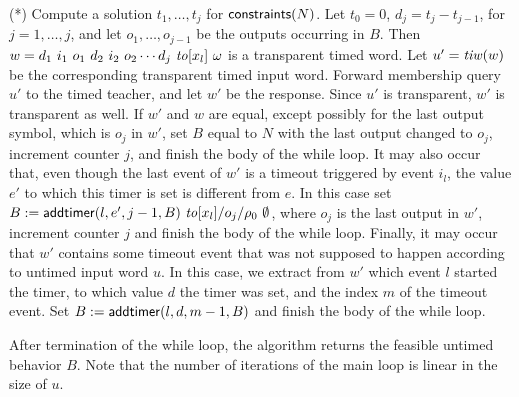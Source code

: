 \begin{enumerate}
\vspace{0.3em}
(*) Compute a solution $t_1 ,\ldots, t_j$ for $\mathsf{constraints}({N})$.
Let $t_0 = 0$, $d_j = t_j - t_{j-1}$, for $j = 1,\ldots, j$, and let
$o_1 ,\ldots, o_{j-1}$ be the outputs occurring in $B$. 
Then $w = d_1 ~ i_1 ~ o_1 ~ d_2 ~ i_2 ~ o_2 \cdots d_j ~ \mathit{to}[x_l] ~ \omega$ is a transparent timed word.
Let $u' = \mathit{tiw}(w)$ be the corresponding transparent timed input word.
Forward membership query $u'$ to the timed teacher, and let $w'$ be the response.
Since $u'$ is transparent, $w'$ is transparent as well.
If $w'$ and $w$ are equal, except possibly for the last output symbol, which is $o_j$ in $w'$,
set $B$ equal to $N$ with the last output changed to $o_j$, increment counter $j$, and finish the body of the while loop.
It may also occur that, even though the last event of $w'$ is a timeout triggered by event $i_l$, the value $e'$ to which this timer is
set is different from $e$. In this case  set
$B := \mathsf{addtimer}({l,e',j-1,B}) ~ \mathit{to}[x_l]/o_j/\rho_0 ~ \emptyset$, where $o_j$ is the last output in $w'$,
increment counter $j$ and finish the body of the while loop.
Finally, it may occur that $w'$ contains some timeout event that was not supposed to happen according to untimed input word $u$.
In this case, we extract from $w'$ which event $l$ started the timer, to which value
$d$ the timer was set, and the index $m$ of the timeout event.
Set $B := \mathsf{addtimer}({l,d,m-1,B})$ and finish the body of the while loop. 
\end{enumerate}
After termination of the while loop, the algorithm returns the feasible untimed behavior $B$.
Note that the number of iterations of the main loop is linear in the size of $u$.

